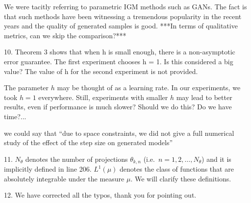 \documentclass{article}
\newcommand{\rev}[1]{{\color{red} #1}}
\newcommand{\umut}[1]{{\color{blue} #1}}
\newcommand{\alain}[1]{{\color{cyan} #1}}
\newcommand{\antoine}[1]{{\color{orange} #1}}
\begin{document}
\antoine{We were tacitly referring to parametric IGM methods such as GANs. The fact is that such methods have been witnessing a tremendous popularity in the recent years and the quality of generated samples is good. ***In terms of qualitative metrics, can we skip the comparison?***}

\rev{10. Theorem 3 shows that when h is small enough, there is a non-asymptotic error guarantee. The first experiment chooses h = 1. Is this considered a big value? The value of h for the second experiment is not provided.}

\antoine{The parameter $h$ may be thought of as a learning rate. In our experiments, we took $h=1$ everywhere. Still, experiments with smaller $h$ may lead to better results, even if performance is much slower? Should we do this? Do we have time?...}

\alain{we could say that ``due to space constraints, we did not give a full numerical study of the effect of the step size on generated models''}


11. $N_\theta$ denotes the number of projections $\theta_{k,n}$ (i.e.\ $n = 1,2,\dots, N_\theta$) and it is implicitly defined in line 206. $L^1(\mu)$ denotes the class of functions that are absolutely integrable under the measure $\mu$. We will clarify these definitions.


12. We have corrected all the typos, thank you for pointing out.
\end{document}
